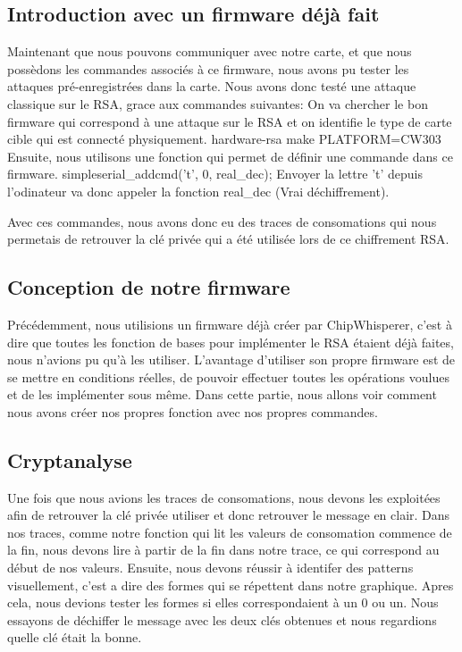 \subsection{Introduction avec un firmware déjà fait}
Maintenant que nous pouvons communiquer avec notre carte, et que nous possèdons les commandes associés à ce firmware, nous avons pu tester les attaques pré-enregistrées dans la carte. 
Nous avons donc testé une attaque classique sur le RSA, grace aux commandes suivantes: 
On va chercher le bon firmware qui correspond à une attaque sur le RSA et on identifie le type de carte cible qui est connecté physiquement.
hardware\victims\firmware\simpleserial-rsa
make PLATFORM=CW303
Ensuite, nous utilisons une fonction qui permet de définir une commande dans ce firmware. 
simpleserial_addcmd('t', 0,  real_dec);
Envoyer la lettre 't' depuis l'odinateur va donc appeler la fonction real_dec (Vrai déchiffrement).



Avec ces commandes, nous avons donc eu des traces de consomations qui nous permetais de retrouver la clé privée qui a été utilisée lors de ce chiffrement RSA.
\subsection{Conception de notre firmware}
Précédemment, nous utilisions un firmware déjà créer par ChipWhisperer, c'est à dire que toutes les fonction de bases pour implémenter le RSA étaient déjà faites, nous n'avions pu qu'à les utiliser. L'avantage d'utiliser son propre firmware est de se mettre en conditions réelles, de pouvoir effectuer toutes les opérations voulues et de les implémenter sous même.
Dans cette partie, nous allons voir comment nous avons créer nos propres fonction avec nos propres commandes.

\subsection{Cryptanalyse}
Une fois que nous avions les traces de consomations, nous devons les exploitées afin de retrouver la clé privée utiliser et donc retrouver le message en clair. 
Dans nos traces, comme notre fonction qui lit les valeurs de consomation commence de la fin, nous devons lire à partir de la fin dans notre trace, ce qui correspond au début de nos valeurs. 
Ensuite, nous devons réussir à identifer des patterns visuellement, c'est a dire des formes qui se répettent dans notre graphique. 
Apres cela, nous devions tester les formes si elles correspondaient à un 0 ou un. Nous essayons de déchiffer le message avec les deux clés obtenues et nous regardions quelle clé était la bonne.
